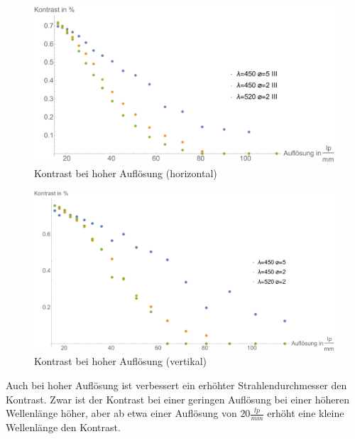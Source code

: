 \begin{minipage}{\linewidth}
\begin{figure}[H]
	\centering
\includegraphics[width=1.0\linewidth]{IMAGE/Versuch2Plot2horizontal2.pdf}
	\caption{Kontrast bei hoher Auflösung (horizontal)}
	\label{fig:Versuch2_Plot2h2}
\end{figure} 

\begin{figure}[H]
	\centering
\includegraphics[width=1.0\linewidth]{IMAGE/Versuch2Plot2vertikal2.pdf}
	\caption{Kontrast bei hoher Auflösung (vertikal)}
	\label{fig:Versuch2_Plot2v2}
\end{figure} 

Auch bei hoher Auflösung ist verbessert ein erhöhter Strahlendurchmesser  den Kontrast. Zwar ist der Kontrast bei einer geringen Auflösung bei einer höheren Wellenlänge höher, aber ab etwa einer Auflösung von $20 \frac{lp}{mm}$ erhöht eine kleine Wellenlänge den Kontrast.
\end{minipage}



